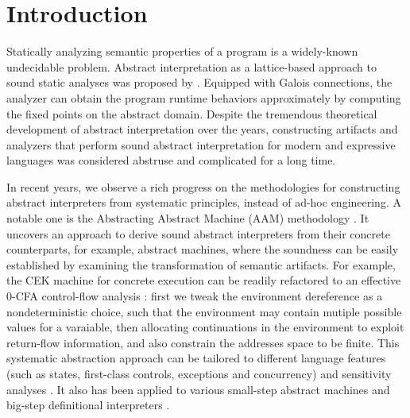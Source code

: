 \section{Introduction} \label{intro}

Statically analyzing semantic properties of a program is a
widely-known undecidable problem. Abstract interpretation as a
lattice-based approach to sound static analyses was proposed by
\citet{DBLP:conf/popl/CousotC77}. Equipped with Galois connections,
the analyzer can obtain the program runtime behaviors approximately by
computing the fixed points on the abstract domain. Despite the
tremendous theoretical development of abstract interpretation over the
years, constructing artifacts and analyzers that perform sound
abstract interpretation for modern and expressive languages was
considered abstruse and complicated for a long time.

In recent years, we observe a rich progress on the methodologies for
constructing abstract interpreters from systematic principles, instead
of ad-hoc engineering. A notable one is the Abstracting Abstract
Machine (AAM) methodology \cite{DBLP:journals/jfp/HornM12,
  DBLP:conf/icfp/HornM10}. It uncovers an approach to derive sound
abstract interpreters from their concrete counterparts, for example,
abstract machines, where the soundness can be easily established by
examining the transformation of semantic artifacts. For example, the
CEK machine \cite{DBLP:conf/popl/FelleisenF87} for concrete execution
can be readily refactored to an effective $0$-CFA control-flow
analysis \cite{Shivers:1988:CFA:53990.54007,
  Midtgaard:2012:CAF:2187671.2187672}: first we tweak the environment
dereference as a nondeterministic choice, such that the environment
may contain mutiple possible values for a varaiable, then allocating
continuations in the environment to exploit return-flow information,
and also constrain the addresses space to be finite.  This systematic
abstraction approach can be tailored to different language features
(such as states, first-class controls, exceptions and concurrency) and
sensitivity analyses \cite{DBLP:conf/icfp/Gilray0M16,
  DBLP:conf/popl/GilrayL0MH16, Darais:2015:GTM:2814270.2814308}. It
also has been applied to various small-step abstract machines
\cite{DBLP:journals/jfp/HornM12, DBLP:conf/icfp/HornM10,
  Sergey:2013:MAI:2491956.2491979} and big-step definitional
interpreters \cite{Wei:2018:RAA:3243631.3236800,
  DBLP:journals/pacmpl/DaraisLNH17, Keidel:2018:CSP:3243631.3236767}.

